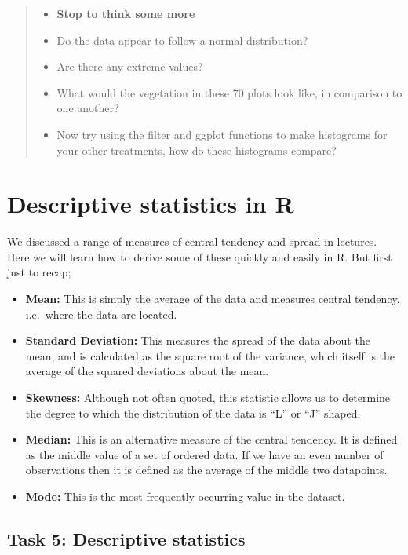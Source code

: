 \documentclass[
]{book}
\providecommand{\tightlist}{%
  \setlength{\itemsep}{0pt}\setlength{\parskip}{0pt}}
\begin{document}
\begin{quote}
\begin{itemize}
\tightlist
\item
  \textbf{Stop to think some more}
\item
  Do the data appear to follow a normal distribution?
\item
  Are there any extreme values?
\item
  What would the vegetation in these 70 plots look like, in comparison to one another?
\item
  Now try using the filter and ggplot functions to make histograms for your other treatments, how do these histograms compare?
\end{itemize}
\end{quote}

\section{Descriptive statistics in R}\label{descriptive-statistics-in-r}

We discussed a range of measures of central tendency and spread in lectures. Here we will learn how to derive some of these quickly and easily in R. But first just to recap;

\begin{itemize}
\tightlist
\item
  \textbf{Mean:} This is simply the average of the data and measures central tendency, i.e.~where the data are located.
\item
  \textbf{Standard Deviation:} This measures the spread of the data about the mean, and is calculated as the square root of the variance, which itself is the average of the squared deviations about the mean.
\item
  \textbf{Skewness:} Although not often quoted, this statistic allows us to determine the degree to which the distribution of the data is ``L'' or ``J'' shaped.
\item
  \textbf{Median:} This is an alternative measure of the central tendency. It is defined as the middle value of a set of ordered data. If we have an even number of observations then it is defined as the average of the middle two datapoints.
\item
  \textbf{Mode:} This is the most frequently occurring value in the dataset.
\end{itemize}

\subsection{Task 5: Descriptive statistics}\label{descriptive-statistics}
\end{document}
